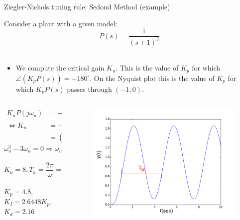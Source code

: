 \begin{frame}{Ziegler-Nichols tuning rule: Sedond Method (example)}
	\vspace{-1em}
	\footnotesize{
	\begin{example}
		Consider a plant with a given model:\\
		\vspace{-0.5em}
		$$ P(s) = \frac{1}{(s+1)^3} $$\\
		\vspace{-0.7em}
		\begin{itemize}
		\item We compute the critical gain $K_u$. This is the value of $K_p$ for which $\angle (K_p P(s)) = - 180^\circ$. On the Nyquist plot this is the value of $K_p$ for which $K_p P(s)$ passes through $(-1,0)$.\\
		\end{itemize}
		\vspace{-1.5em}
		\begin{columns}
			\begin{column}{0.5 \textwidth}
				\begin{align*}
				K_uP(j\omega_u) &= -1 \\ \Leftrightarrow K_u &= 	-(j\omega_u + 1)^3 \\
				& = (3\omega_u^2-1)+j(\omega_u^3 - 3\omega_u)
				\end{align*}
				\vspace{-1.5em}
				$$ \omega_u^3-3\omega_u = 0 \Rightarrow \omega_u = \sqrt{3}$$\\
				\vspace{-1.5em}
				$$K_u = 8, T_u = \frac{2\pi}{\omega} = 3.628$$\\
				$K_p = 4.8$, $K_I = 2.6448  K_p$, $K_d =  2.16$
			\end{column}
			\begin{column}{0.4 \textwidth}
			\begin{figure}
				\centering
				\includegraphics[width=1\linewidth]{img/Z_N_PID_example}
			\end{figure}
			\end{column}
		\end{columns}
	\end{example}}
\end{frame}

